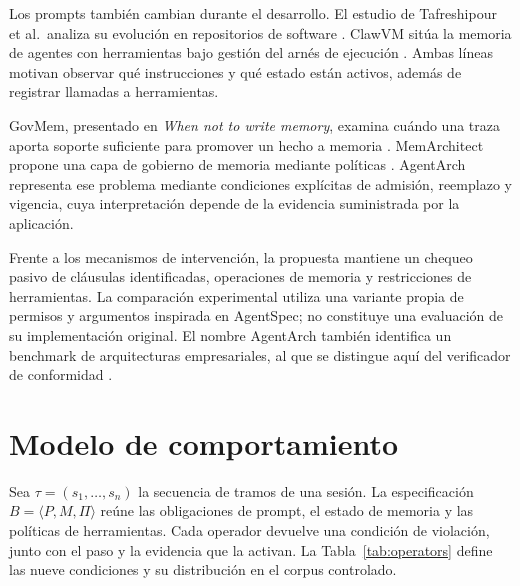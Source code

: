 \documentclass[conference]{IEEEtran}
\begin{document}
Los prompts también cambian durante el desarrollo. El estudio de Tafreshipour et al.\ analiza su evolución en repositorios de software \cite{prompts}. ClawVM sitúa la memoria de agentes con herramientas bajo gestión del arnés de ejecución \cite{claw}. Ambas líneas motivan observar qué instrucciones y qué estado están activos, además de registrar llamadas a herramientas.

GovMem, presentado en \emph{When not to write memory}, examina cuándo una traza aporta soporte suficiente para promover un hecho a memoria \cite{govmem}. MemArchitect propone una capa de gobierno de memoria mediante políticas \cite{memarch}. AgentArch representa ese problema mediante condiciones explícitas de admisión, reemplazo y vigencia, cuya interpretación depende de la evidencia suministrada por la aplicación.

Frente a los mecanismos de intervención, la propuesta mantiene un chequeo pasivo de cláusulas identificadas, operaciones de memoria y restricciones de herramientas. La comparación experimental utiliza una variante propia de permisos y argumentos inspirada en AgentSpec; no constituye una evaluación de su implementación original. El nombre AgentArch también identifica un benchmark de arquitecturas empresariales, al que se distingue aquí del verificador de conformidad \cite{enterpriseagentarch}.

\section{Modelo de comportamiento}
Sea \(\tau=(s_1,\ldots,s_n)\) la secuencia de tramos de una sesión. La especificación \(B=\langle P,M,\Pi\rangle\) reúne las obligaciones de prompt, el estado de memoria y las políticas de herramientas. Cada operador devuelve una condición de violación, junto con el paso y la evidencia que la activan. La Tabla~\ref{tab:operators} define las nueve condiciones y su distribución en el corpus controlado.
\end{document}
